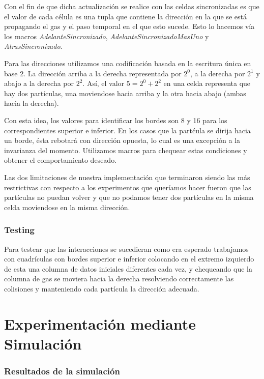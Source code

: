 \documentclass[10pt,a4paper]{article}
\begin{document}
Con el fin de que dicha actualizaci\'on se realice con las celdas sincronizadas es que el valor de cada c\'elula es una tupla que contiene la direcci\'on en la que se est\'a propagando el gas y el paso temporal en el que esto sucede. Esto lo hacemos v\'ia los macros \textit{AdelanteSincronizado}, \textit{AdelanteSincronizadoMasUno} y \textit{AtrasSincronizado}.

Para las direcciones utilizamos una codificaci\'on basada en la escritura \'unica en base 2. La direcci\'on arriba a la derecha representada por $2^0$, a la derecha por $2^1$ y abajo a la derecha por $2^2$. As\'i, el valor $5=2^0+2^2$ en una celda representa que hay dos part\'iculas, una moviendose hacia arriba y la otra hacia abajo (ambas hacia la derecha).

Con esta idea, los valores para identificar los bordes son 8 y 16 para los correspondientes superior e inferior. En los casos que la part\'cula se dirija hacia un borde, \'esta rebotar\'a con direcci\'on opuesta, lo cual es una excepci\'on a la
invarianza del momento. Utilizamos macros para chequear estas condiciones y obtener el comportamiento deseado.

Las dos limitaciones de nuestra implementaci\'on que terminaron siendo las m\'as restrictivas con respecto a los experimentos que quer\'iamos hacer fueron que las part\'iculas no puedan volver y que no podamos tener dos part\'iculas en la misma celda moviendose en la misma direcci\'on.


\section*{Testing}

Para testear que las interacciones se sucedieran como era esperado trabajamos con cuadr\'iculas con bordes superior e inferior colocando en el extremo izquierdo de esta una columna de datos iniciales diferentes cada vez, y chequeando que la columna de gas se moviera hacia la derecha resolviendo correctamente las colisiones y manteniendo cada part\'icula la direcci\'on adecuada. 

 

\part*{Experimentaci\'on mediante Simulaci\'on}
\section*{Resultados de la simulaci\'on}
\end{document}
